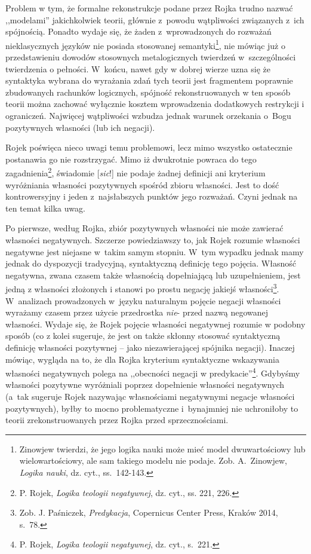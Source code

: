 Problem w tym, że formalne rekonstrukcje podane przez Rojka trudno nazwać
,,modelami'' jakichkolwiek teorii, głównie z~powodu wątpliwości
związanych z~ich spójnością. Ponadto wydaje się, że żaden z~wprowadzonych do
rozważań nieklasycznych języków nie posiada stosowanej semantyki\footnote{Zinowjew twierdzi, że jego
logika nauki może mieć model dwuwartościowy lub wielowartościowy, ale sam takiego modelu nie podaje. Zob.
A.~Zinowjew, \textit{Logika nauki}, dz. cyt., ss.~142-143.},
nie mówiąc już o przedstawieniu dowodów stosownych metalogicznych twierdzeń
w~szczególności twierdzenia o pełności.
W~końcu, nawet gdy w dobrej wierze uzna się że syntaktyka wybrana do wyrażania
zdań tych teorii jest  fragmentem poprawnie zbudowanych rachunków logicznych,
spójność rekonstruowanych w ten sposób teorii można zachować wyłącznie kosztem wprowadzenia dodatkowych restrykcji
i ograniczeń. Najwięcej wątpliwości wzbudza jednak
warunek orzekania o~Bogu pozytywnych
własności (lub ich negacji).




Rojek poświęca nieco uwagi temu problemowi, lecz mimo wszystko ostatecznie
postanawia go nie rozstrzygać.
Mimo iż dwukrotnie powraca do tego zagadnienia\footnote{P. Rojek, \textit{Logika teologii negatywnej}, dz. cyt.,
ss. 221, 226. }, świadomie [\textit{sic}!] nie podaje żadnej definicji
ani kryterium wyróżniania własności pozytywnych spośród zbioru
własności. Jest to dość kontrowersyjny i jeden z~najsłabszych
punktów jego rozważań.
Czyni jednak na ten temat kilka uwag.




Po pierwsze, według Rojka, zbiór pozytywnych własności nie może zawierać
własności negatywnych. Szczerze powiedziawszy to, jak Rojek rozumie własności negatywne jest niejasne
w~takim samym stopniu. W~tym wypadku
jednak mamy jednak do dyspozycji tradycyjną, syntaktyczną definicję tego pojęcia.
Własność negatywna, zwana czasem także własnością dopełniającą lub uzupełnieniem, jest
jedną z własności złożonych i stanowi po prostu negację jakiejś
własności\footnote{Zob. J. Paśniczek, \textit{Predykacja}, Copernicus
Center Press, Kraków 2014, s.~78.}. W~analizach prowadzonych
w~języku naturalnym pojęcie negacji własności wyrażamy czasem przez użycie
przedrostka \textit{nie}-  przed nazwą negowanej własności. Wydaje się, że Rojek pojęcie
własności negatywnej rozumie w podobny sposób (co z kolei sugeruje, że jest on także skłonny
stosować syntaktyczną definicję własności pozytywnej -- jako
niezawierającej spójnika negacji).
Inaczej mówiąc, wygląda na to, że dla Rojka kryterium
syntaktyczne wskazywania własności negatywnych polega na ,,obecności negacji w
predykacie''\footnote{P. Rojek, \textit{Logika teologii negatywnej}, dz. cyt., s.~221. }. Gdybyśmy własności pozytywne wyróżniali poprzez dopełnienie własności negatywnych (a~tak sugeruje Rojek nazywając własnościami negatywnymi negacje własności pozytywnych), byłby to mocno problematyczne i~bynajmniej nie uchroniłoby to
teorii zrekonstruowanych przez Rojka przed sprzecznościami.

